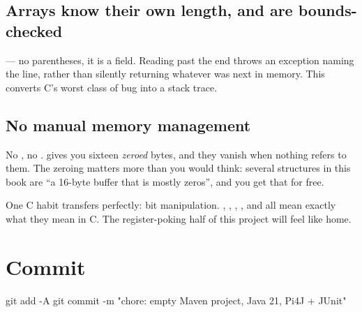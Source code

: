 \subsection{Arrays know their own length, and are bounds-checked}

 --- no parentheses, it is a field. Reading past the end throws
an exception naming the line, rather than silently returning whatever was next in
memory. This converts C's worst class of bug into a stack trace.

\subsection{No manual memory management}

No , no .  gives you sixteen
\emph{zeroed} bytes, and they vanish when nothing refers to them. The zeroing
matters more than you would think: several structures in this book are ``a
16-byte buffer that is mostly zeros'', and you get that for free.

\medskip
One C habit transfers perfectly: bit manipulation. \code{<<}, \code{>>},
\code{\&}, \code{|}, \code{\^{}} and \code{\~{}} all mean exactly what they mean
in C. The register-poking half of this project will feel like home.

\section{Commit}

\begin{shell}
git add -A
git commit -m "chore: empty Maven project, Java 21, Pi4J + JUnit"
\end{shell}
